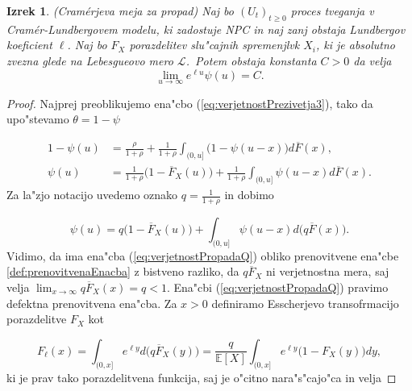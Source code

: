 \documentclass[12pt, a4paper, reqno]{amsart}
\theoremstyle{definition}
\theoremstyle{plain}
\newtheorem{izrek}[definicija]{Izrek}
\newcommand{\E}{\mathbb{E}}
\newcommand{\1}{\mathds{1}}
\begin{document}
            \begin{izrek}(Cramérjeva meja za propad)
                Naj bo $(U_t)_{t\geq0}$ proces tveganja v Cramér-Lundbergovem modelu, ki zadostuje NPC in 
                naj zanj obstaja Lundbergov koeficient $\ell$. Naj bo $F_{X}$ porazdelitev slu"cajnih spremenjlvk
                $X_i$, ki je absolutno zvezna glede na Lebesgueovo mero $\mathcal{L}$.\ Potem obstaja konstanta $C>0$ da
                velja 
                \begin{equation*}
                    \lim_{u\to\infty}e^{\ell u}\psi(u) = C.
                \end{equation*}
                \label{izr:CramerjevaMeja}
            \end{izrek}

            \begin{proof} 
                Najprej preoblikujemo ena"cbo (\ref{eq:verjetnostPrezivetja3}), tako da 
                upo"stevamo $\theta = 1 - \psi$

                \begin{align*}
                    1 - \psi(u) &= \frac{\rho}{1 + \rho} + \frac{1}{1 + \rho}\int_{(0, u]}\bigl(1 - \psi(u - x)\bigr)d\overline{F}(x), \\
                    \psi(u) &= \frac{1}{1 + \rho}\bigl(1 - \overline{F}_X(u)\bigr) + \frac{1}{1 + \rho}\int_{(0, u]}\psi(u - x)d\overline{F}(x).
                \end{align*}
                Za la"zjo notacijo uvedemo oznako $q = \frac{1}{1 + \rho}$ in dobimo

                \begin{equation}
                    \psi(u) = q\bigl(1 - \overline{F}_X(u)\bigr) + \int_{(0, u]}\psi(u - x)d\bigl(q\overline{F}(x)\bigr).
                    \label{eq:verjetnostPropadaQ}
                \end{equation}
                Vidimo, da ima ena"cba (\ref{eq:verjetnostPropadaQ}) obliko prenovitvene 
                ena"cbe \ref{def:prenovitvenaEnacba} z bistveno razliko, da $q\overline{F}_X$ ni
                verjetnostna mera, saj velja $\lim_{x\to\infty}q\overline{F}_X(x) = q < 1$. Ena"cbi 
                (\ref{eq:verjetnostPropadaQ}) pravimo defektna prenovitvena ena"cba. Za $x > 0$ 
                definiramo Esscherjevo transofrmacijo porazdelitve $F_X$ kot 

                \begin{equation*}
                    F_\ell(x) = \int_{(0, x]}e^{\ell y}d\bigl(q\overline{F}_X(y)\bigr) = \frac{q}{\E\left[X\right]}\int_{(0, x]}e^{\ell y}\bigl(1 - F_X(y)\bigr)dy, 
                \end{equation*}
                ki je prav tako porazdelitvena funkcija, saj je o"citno nara"s"cajo"ca in 
                velja 


\end{proof}
\end{document}
